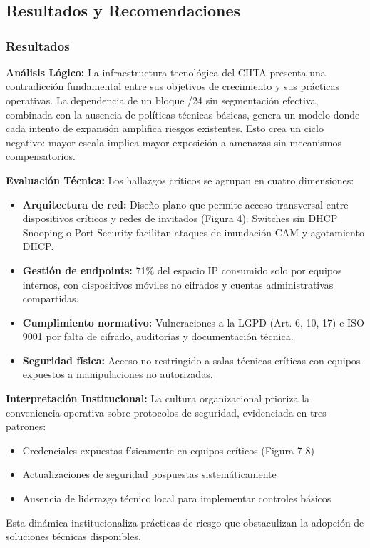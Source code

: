 \section{}
\setcounter{subsection}{3}

\subsection{Resultados y Recomendaciones}

\subsubsection{Resultados}

\textbf{Análisis Lógico:}  
La infraestructura tecnológica del CIITA presenta una contradicción fundamental entre sus objetivos de crecimiento y sus prácticas operativas. La dependencia de un bloque /24 sin segmentación efectiva, combinada con la ausencia de políticas técnicas básicas, genera un modelo donde cada intento de expansión amplifica riesgos existentes. Esto crea un ciclo negativo: mayor escala implica mayor exposición a amenazas sin mecanismos compensatorios.

\textbf{Evaluación Técnica:}  
Los hallazgos críticos se agrupan en cuatro dimensiones:
\begin{itemize}
	\item \textbf{Arquitectura de red:} Diseño plano que permite acceso transversal entre dispositivos críticos y redes de invitados (Figura 4). Switches sin DHCP Snooping o Port Security facilitan ataques de inundación CAM y agotamiento DHCP.
	\item \textbf{Gestión de endpoints:} 71\% del espacio IP consumido solo por equipos internos, con dispositivos móviles no cifrados y cuentas administrativas compartidas.
	\item \textbf{Cumplimiento normativo:} Vulneraciones a la LGPD (Art. 6, 10, 17) e ISO 9001 por falta de cifrado, auditorías y documentación técnica.
	\item \textbf{Seguridad física:} Acceso no restringido a salas técnicas críticas con equipos expuestos a manipulaciones no autorizadas.
\end{itemize}

\textbf{Interpretación Institucional:}  
La cultura organizacional prioriza la conveniencia operativa sobre protocolos de seguridad, evidenciada en tres patrones:
\begin{itemize}
	\item Credenciales expuestas físicamente en equipos críticos (Figura 7-8)
	\item Actualizaciones de seguridad pospuestas sistemáticamente
	\item Ausencia de liderazgo técnico local para implementar controles básicos
\end{itemize}
Esta dinámica institucionaliza prácticas de riesgo que obstaculizan la adopción de soluciones técnicas disponibles.

